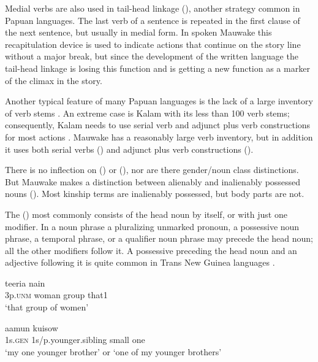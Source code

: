 Medial verbs are also used in tail-head linkage (), another strategy common in Papuan languages. The last verb of a sentence is repeated in the first clause of the next sentence, but usually in medial form.  In spoken Mauwake this recapitulation device is used to indicate actions that continue on the story line without a major break, but since the development of the written language the tail-head linkage is losing this function and is getting a new function as a  marker of the climax in the story.

Another typical feature of many Papuan languages is the lack of a large inventory of verb stems \citep[127]{Foley1986}. An extreme case is Kalam with its less than 100 verb stems; consequently, Kalam needs to use serial verb and adjunct plus verb constructions for most actions \citep[336--337]{Pawley1987}. Mauwake has a reasonably large verb inventory, but in addition it uses both serial verbs () and adjunct plus verb constructions ().

There is no inflection on  () or (), nor are there gender/noun class distinctions. But Mauwake makes a distinction between alienably and inalienably possessed nouns ().  Most kinship terms are inalienably possessed, but body parts are not.

The  () most commonly consists of the head noun by itself, or with just one modifier.  In a noun phrase a pluralizing  unmarked pronoun, a possessive noun phrase, a temporal phrase, or a qualifier noun phrase may precede the head noun; all the other modifiers follow it. A possessive preceding the head noun and an adjective following it  is quite common in Trans New Guinea languages \citep[19]{Reesink1987}. 

\ea%
\label{ex:1:x658}
\gll {}   teeria  nain \\
 3p.\textsc{unm}  woman  group  that1     \\
\glt `that group of women'
\z


\ea%
\label{ex:1:x660}
\gll {}  aamun    kuisow \\
 1s.\textsc{gen}  1s/p.younger.sibling  small  one     \\
\glt`my one younger brother' or `one of my younger brothers'
\z


